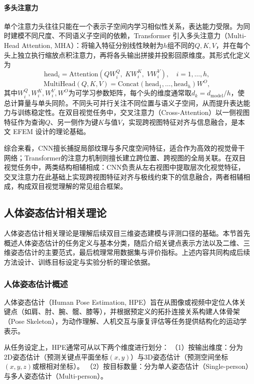 \paragraph{多头注意力}
单个注意力头往往只能在一个表示子空间内学习相似性关系，表达能力受限。为同时建模不同尺度、不同语义子空间的依赖，Transformer 引入多头注意力（Multi-Head Attention, MHA）：将输入特征分别线性映射为$h$组不同的$Q,K,V$，并在每个头上独立执行缩放点积注意力，再将各头输出拼接并投影回原维度。其形式化定义为
\begin{equation}
\text{head}_i=\text{Attention}(QW_i^Q,\;KW_i^K,\;VW_i^V),\quad i=1,\dots,h,
\end{equation}
\begin{equation}
\text{MultiHead}(Q,K,V)=\text{Concat}(\text{head}_1,\dots,\text{head}_h)W^O,
\end{equation}
其中$W_i^Q,W_i^K,W_i^V,W^O$为可学习参数矩阵，每个头的维度通常取$d_k=d_{\text{model}}/h$，使总计算量与单头同阶。不同头可并行关注不同位置与语义子空间，从而提升表达能力与训练稳定性。在双目视觉任务中，交叉注意力（Cross-Attention）以一侧视图特征作为查询$Q$、另一侧作为键$K$与值$V$，实现跨视图特征对齐与信息融合，是本文 EFEM 设计的理论基础。


综合来看，CNN擅长捕捉局部纹理与多尺度空间特征，适合作为高效的视觉骨干网络；Transformer的注意力机制则擅长建立跨位置、跨视图的全局关联。在双目视觉任务中，两类结构相辅相成：CNN负责从左右视图中提取层次化视觉特征，交叉注意力在此基础上实现跨视图特征对齐与极线约束下的信息融合，两者相辅相成，构成双目视觉理解的常见组合框架。

\subsection{人体姿态估计相关理论}\label{subsec:hpe_theory}
人体姿态估计相关理论是理解后续双目三维姿态建模与评测口径的基础。本节首先概述人体姿态估计的任务定义与基本分类，随后介绍关键点表示方法以及二维、三维姿态估计的主要范式，最后梳理常用数据集与评价指标。上述内容共同构成后续方法设计、训练目标设定与实验分析的理论依据。

\subsubsection{人体姿态估计概述}
人体姿态估计（Human Pose Estimation, HPE）旨在从图像或视频中定位人体关键点（如肩、肘、腕、髋、膝等），并根据预定义的拓扑连接关系构建人体骨架（Pose Skeleton），为动作理解、人机交互与康复评估等任务提供结构化的运动学表示。

从任务设定上，HPE通常可从以下两个维度进行划分：
（1）按输出维度：分为2D姿态估计（预测关键点平面坐标$ (x,y) $）与3D姿态估计（预测空间坐标$ (x,y,z) $或根相对坐标）。
（2）按目标数量：分为单人姿态估计（Single-person）与多人姿态估计（Multi-person）。


